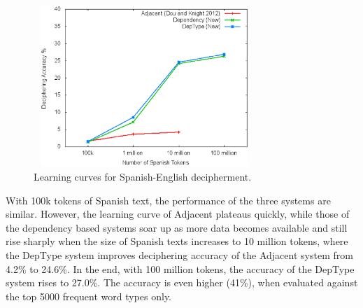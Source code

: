  \begin{figure}[!ht]
  \centering
  \includegraphics[width=3.3in,height=2.4in]{curve}
  \caption{Learning curves for Spanish-English decipherment.}
\label{es-en-curve}
\end{figure}

With 100k tokens of Spanish text, the performance of the three systems are similar. However, the learning curve of Adjacent plateaus quickly, while those of the dependency based systems soar up as more data becomes available and still rise sharply when the size of Spanish texts increases to 10 million tokens, where the DepType system improves deciphering accuracy of the Adjacent system from 4.2\% to 24.6\%. In the end, with 100 million tokens, the accuracy of the DepType system rises to 27.0\%. The accuracy is even higher (41\%), when evaluated against the top 5000 frequent word types only.




